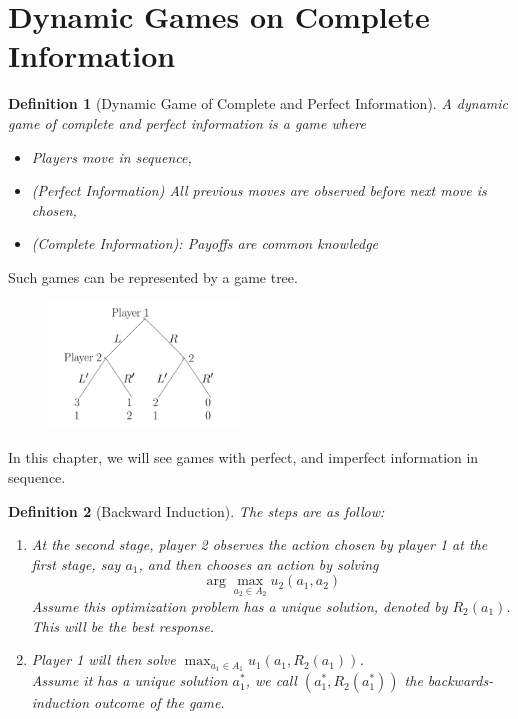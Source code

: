 \documentclass[12pt]{article}
\newtheorem{definition}{Definition}[section]
\theoremstyle{definition}
\begin{document}
\section{Dynamic Games on Complete Information}
\begin{definition}[Dynamic Game of Complete and Perfect Information]
\normalfont A dynamic game of complete and perfect information is a game where
\begin{itemize}
  \item Players move in sequence, 
  \item (Perfect Information) All previous moves are observed before next move is chosen,
  \item (Complete Information): Payoffs are common knowledge
\end{itemize}
\end{definition}
Such games can be represented by a game tree.\\
\begin{figure}[h]
\centering
\includegraphics[width=0.45\textwidth]{2-1.jpg}
\end{figure}
In this chapter, we will see games with perfect, and imperfect information in sequence.
\begin{definition}[Backward Induction]
\normalfont The steps are as follow:
\begin{enumerate}
  \item At the second stage, player 2 observes the action chosen by player 1 at the first stage, say $a_1$, and then chooses an action by solving 
  \[
\arg \max_{a_2\in A_2} u_2(a_1, a_2)
  \]
  Assume this optimization problem has a unique solution, denoted by $R_2(a_1)$. This will be the best response.
  \item Player 1 will then solve $\max_{a_1\in A_1}u_1(a_1, R_2(a_1))$.\\
  Assume it has a unique solution $a_1^\ast$, we call $(a_1^\ast, R_2(a_1^\ast))$ the backwards-induction outcome of the game.
\end{enumerate}
\end{definition}
\end{document}
